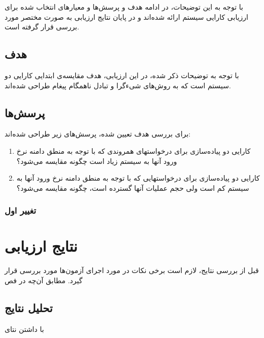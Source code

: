 با توجه به این توضیحات، در ادامه هدف و پرسش‌ها و معیارهای انتخاب شده برای ارزیابی کارایی سیستم ارائه شده‌اند و در پایان نتایج ارزیابی به صورت مختصر مورد بررسی قرار گرفته است.
\subsection{هدف}
با توجه به توضیحات ذکر شده، در این ارزیابی، هدف مقایسه‌ی ابتدایی کارایی دو سیستم است که به روش‌های شیءگرا و تبادل ناهمگام پیغام طراحی شده‌اند. 
\subsection{پرسش‌ها}
برای بررسی هدف تعیین شده، پرسش‌های زیر طراحی شده‌اند:
\begin{enumerate}
\item کارایی دو پیاده‌سازی برای درخواستهای همروندی که با توجه به منطق دامنه نرخ ورود آنها به سیستم زیاد است چگونه مقایسه می‌شود؟
\item کارایی دو پیاده‌سازی برای درخواستهایی که با توجه به منطق دامنه نرخ ورود آنها به سیستم کم است ولی حجم عملیات آنها گسترده است، چگونه مقایسه می‌شود؟

\end{enumerate}
\subsubsection{تغییر اول}

\section{نتایج ارزیابی}
قبل از بررسی نتایج، لازم است برخی نکات در مورد اجرای آزمون‌ها مورد بررسی قرار گیرد. مطابق آن‌چه در فص

\subsection{تحلیل نتایج}
با داشتن نتای